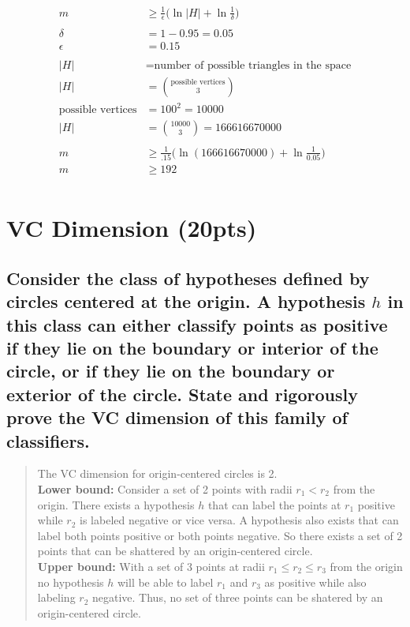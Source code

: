 \documentclass[11pt]{article}
\begin{document}
\begin{align*}
	m &\geq \frac{1}{\epsilon}\bigg(\ln \vert H \vert + \ln\frac{1}{\delta}\bigg)\\
	\\
	\delta &= 1-0.95 = 0.05\\
	\epsilon &= 0.15\\
	\\
	\vert H \vert &= \text{number of possible triangles in the space}\\
	\vert H \vert &= {{\text{possible vertices}}\choose{3}}\\
	\text{possible vertices} &= 100^2 = 10000\\
	\vert H \vert &= {{10000}\choose{3}}=166616670000\\
	\\
	m &\geq \frac{1}{.15}\bigg(\ln(166616670000) + \ln\frac{1}{0.05}\bigg)\\
	m &\geq 192\\
\end{align*}

\section{VC Dimension (20pts)}

\subsection{Consider the class of hypotheses defined by circles centered at the origin. A hypothesis $h$ in this class can either classify points as positive if they lie on the boundary or interior of the circle, or if they lie on the boundary or exterior of the circle. State and rigorously prove the VC dimension of this family of classifiers.}
\begin{quote}
	The VC dimension for origin-centered circles is 2.
	\\
	\textbf{Lower bound:} Consider a set of 2 points with radii $r_1 < r_2$ from the origin. There exists a hypothesis $h$ that can label the points at $r_1$ positive while $r_2$ is labeled negative or vice versa. A hypothesis also exists that can label both points positive or both points negative. So there exists a set of 2 points that can be shattered by an origin-centered circle.
	\\
	\textbf{Upper bound:} With a set of 3 points at radii $r_1 \leq r_2 \leq r_3$ from the origin no hypothesis $h$ will be able to label $r_1$ and $r_3$ as positive while also labeling $r_2$ negative. Thus, no set of three points can be shatered by an origin-centered circle.
\end{quote}
\end{document}
